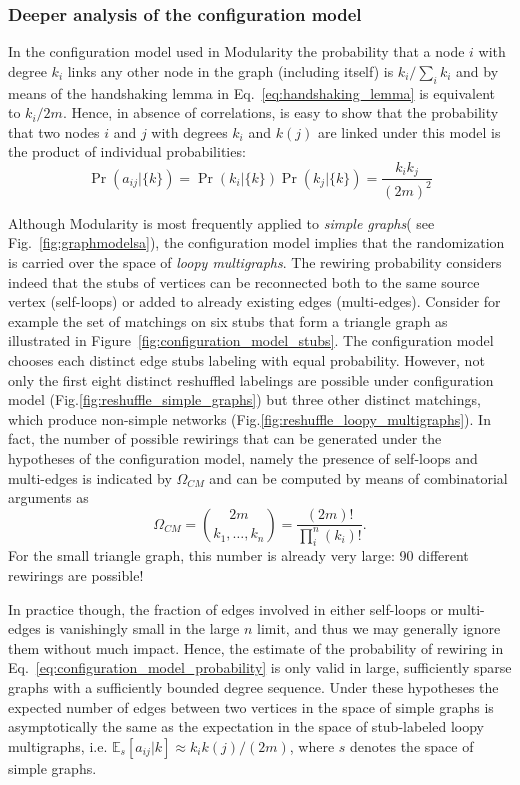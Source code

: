 \subsubsection{Deeper analysis of the configuration model}
In the configuration model used in Modularity the probability that a node $i$ with degree $k_i$ links any other node in the graph (including itself) is $k_i/\sum_{i}k_i$ and by means of the handshaking lemma in Eq.~\ref{eq:handshaking_lemma} is equivalent to $k_i/2m$.
Hence, in absence of correlations, is easy to show that the probability that two nodes $i$ and $j$ with degrees $k_i$ and $k(j)$ are linked under this model is the product of individual probabilities:
\begin{equation}\label{eq:configuration_model_probability}
\Pr \left ( a_{ij} | \{ k \} \right) = \Pr(k_i | \{ k \})\Pr(k_j | \{ k \})=\frac{k_i k_j}{(2m)^2}
\end{equation}

Although Modularity is most frequently applied to \emph{simple graphs}( see Fig.~\ref{fig:graphmodelsa}), the configuration model implies that the randomization is carried over the space of \emph{loopy multigraphs}.
The rewiring probability considers indeed that the stubs of vertices can be reconnected both to the same source vertex (self-loops) or added to already existing edges (multi-edges).
Consider for example the set of matchings on six stubs that form a triangle graph as illustrated in Figure~\ref{fig:configuration_model_stubs}. The configuration model chooses each distinct edge stubs labeling with equal probability. However, not only the first eight distinct reshuffled labelings are possible under configuration model (Fig.\ref{fig:reshuffle_simple_graphs}) but three other distinct matchings, which produce non-simple networks (Fig.\ref{fig:reshuffle_loopy_multigraphs}). 
In fact, the number of possible rewirings that can be generated under the hypotheses of the configuration model, namely the presence of self-loops and multi-edges is indicated by $\Omega_{CM}$ and can be computed by means of combinatorial arguments as
\begin{equation}\label{eq:cm_possible_rewirings}
\Omega_{CM} = \binom{2m}{k_1,\ldots,k_n} = \frac{(2m)!}{\prod_i^n (k_i)!}.
\end{equation}
For the small triangle graph, this number is already very large: 90 different rewirings are possible!

In practice though, the fraction of edges involved in either self-loops or multi-edges is vanishingly small in the large $n$ limit, and thus we may generally ignore them without much impact. 
Hence, the estimate of the probability of rewiring in Eq.~\ref{eq:configuration_model_probability} is only valid in large, sufficiently sparse graphs with a sufficiently bounded degree sequence.
Under these hypotheses the expected number of edges between two vertices in the space of simple graphs is asymptotically the same as the expectation in the space of stub-labeled loopy multigraphs, i.e. $\mathbb{E}_s[a_{ij} |k] \approx k_i k(j) /(2m)$, where $s$ denotes the space of simple graphs.

